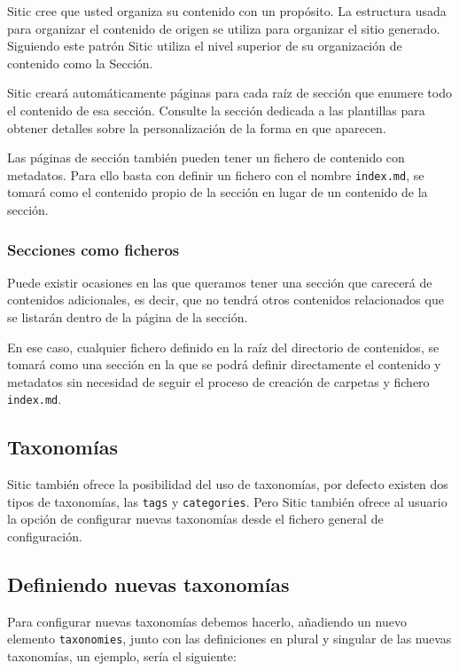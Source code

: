 Sitic cree que usted organiza su contenido con un propósito. La estructura usada
para organizar el contenido de origen se utiliza para organizar el sitio generado. Siguiendo
este patrón Sitic utiliza el nivel superior de su organización de contenido como la Sección.

Sitic creará automáticamente páginas para cada raíz de sección que enumere todo el contenido
de esa sección. Consulte la sección dedicada a las plantillas para obtener detalles sobre
la personalización de la forma en que aparecen.

Las páginas de sección también pueden tener un fichero de contenido con metadatos. Para ello basta con
definir un fichero con el nombre \texttt{index.md}, se tomará como el contenido propio de la sección en
lugar de un contenido de la sección.

\subsubsection{Secciones como ficheros}

Puede existir ocasiones en las que queramos tener una sección que carecerá de contenidos adicionales,
es decir, que no tendrá otros contenidos relacionados que se listarán dentro de la página de la sección.

En ese caso, cualquier fichero definido en la raíz del directorio de contenidos, se tomará como una sección
en la que se podrá definir directamente el contenido y metadatos sin necesidad de seguir el proceso de creación
de carpetas y fichero \texttt{index.md}.

\subsection{Taxonomías}

Sitic también ofrece la posibilidad del uso de taxonomías, por defecto existen dos tipos de taxonomías,
las \texttt{tags} y \texttt{categories}. Pero Sitic también ofrece al usuario la opción de configurar
nuevas taxonomías desde el fichero general de configuración.

\subsection{Definiendo nuevas taxonomías}

Para configurar nuevas taxonomías debemos hacerlo, añadiendo un nuevo elemento \texttt{taxonomies}, junto
con las definiciones en plural y singular de las nuevas taxonomías, un ejemplo, sería el siguiente:

